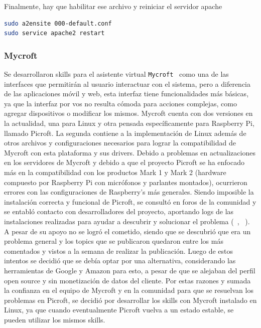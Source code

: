 Finalmente, hay que habilitar ese archivo y reiniciar el servidor apache 

\begin{lstlisting}[language=bash]
sudo a2ensite 000-default.conf
sudo service apache2 restart
\end{lstlisting}



\subsubsection{Mycroft}

Se desarrollaron skills para el asistente virtual \lstinline[columns=fixed]{Mycroft}~\cite{Mycroft} como una de las interfaces que permitirán al usuario interactuar con el sistema, pero a diferencia de las aplicaciones móvil y web, esta interfaz tiene funcionalidades más básicas, ya que la interfaz por vos no resulta cómoda para acciones complejas, como agregar dispositivos o modificar los mismos.
Mycroft cuenta con dos versiones en la actualidad, una para Linux y otra pensada específicamente para Raspberry Pi, llamado Picroft. La segunda contiene a la implementación de Linux además de otros archivos y configuraciones necesarios para lograr la compatibilidad de Mycroft con esta plataforma y sus drivers.
Debido a problemas en actualizaciones en los servidores de Mycroft y debido a que el proyecto Picroft se ha enfocado más en la compatibilidad con los productos Mark 1 y Mark 2 (hardware compuesto por Raspberry Pi con micrófonos y parlantes montados), ocurrieron errores con las configuraciones de Raspberry's más generales.
Siendo imposible la instalación correcta y funcional de Picroft, se consultó en foros de la comunidad y se entabló contacto con desarrolladores del proyecto, aportando logs de las instalaciones realizadas para ayudar a descubrir y solucionar el problema (~\cite{Topic1}, ~\cite{Topic2}).
A pesar de su apoyo no se logró el cometido, siendo que se descubrió que era un problema general y los topics que se publicaron quedaron entre los más comentados y vistos a la semana de realizar la publicación.
Luego de estos intentos se decidió que se debía optar por una alternativa, considerando las herramientas de Google y Amazon para esto, a pesar de que se alejaban del perfil open source y sin monetización de datos del cliente. Por estas razones y sumada la confianza en el equipo de Mycroft y en la comunidad para que se resuelvan los problemas en Picroft, se decidió por desarrollar los skills con Mycroft instalado en Linux, ya que cuando eventualmente Picroft vuelva a un estado estable, se pueden utilizar los mismos skills.

